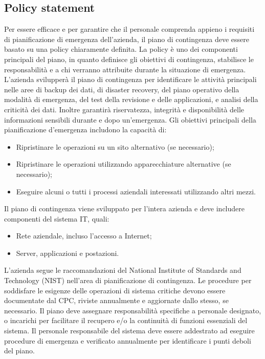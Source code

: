 \documentclass[12pt, a4paper, titlepage]{report}
\begin{document}
		\subsection{Policy statement} \label{policy}
		
		Per essere efficace e per garantire che il personale comprenda appieno i requisiti di pianificazione di emergenza dell'azienda, il piano di contingenza deve essere basato su una policy chiaramente definita.
		La policy è uno dei componenti principali del piano, in quanto definisce gli obiettivi di contingenza, stabilisce le responsabilità e a chi verranno attribuite durante la situazione di emergenza.
		L'azienda svilupperà il piano di contingenza per identificare le attività principali nelle aree di backup dei dati, di disaster recovery, del piano operativo della modalità di emergenza, del test della revisione e delle applicazioni, e analisi della criticità dei dati. Inoltre garantirà riservatezza, integrità e disponibilità delle informazioni sensibili durante e dopo un'emergenza.
		Gli obiettivi principali della pianificazione d'emergenza includono la capacità di:
		\begin{itemize}
			\item Ripristinare le operazioni su un sito alternativo (se necessario);
			\item Ripristinare le operazioni utilizzando apparecchiature alternative (se necessario);
			\item Eseguire alcuni o tutti i processi aziendali interessati utilizzando altri mezzi.
		\end{itemize}
		Il piano di contingenza viene sviluppato per l'intera azienda e deve includere componenti del sistema IT, quali:
		\begin{itemize}
			\item Rete aziendale, incluso l'accesso a Internet;
			\item Server, applicazioni e postazioni.
		\end{itemize}
		L'azienda segue le raccomandazioni del National Institute of Standards and Technology (NIST) nell'area di pianificazione di contingenza. Le procedure per soddisfare le esigenze delle operazioni di sistema critiche devono essere documentate dal CPC, riviste annualmente e aggiornate dallo stesso, se necessario. Il piano deve assegnare responsabilità specifiche a personale designato, o incarichi per facilitare il recupero e/o la continuità di funzioni essenziali del sistema. Il personale responsabile del sistema deve essere addestrato ad eseguire procedure di emergenza e verificato annualmente per identificare i punti deboli del piano.\\
\end{document}

